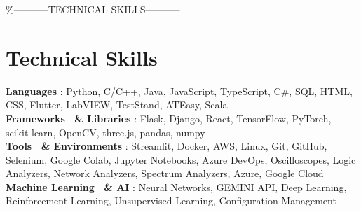 \documentclass[letterpaper,10pt]{article}
\begin{document}
\%-----------TECHNICAL SKILLS-----------
\section{Technical Skills}
 \begin{itemize}[leftmargin=0.15in, label={}]
    \small{\item{
     \textbf{Languages} {: Python, C/C++, Java, JavaScript, TypeScript, C\#, SQL, HTML, CSS, Flutter, LabVIEW, TestStand, ATEasy, Scala} \\
     \textbf{Frameworks \ \& Libraries} {: Flask, Django, React, TensorFlow, PyTorch, scikit-learn, OpenCV, three.js, pandas, numpy} \\
     \textbf{Tools \ \& Environments} {: Streamlit, Docker, AWS, Linux, Git, GitHub, Selenium, Google Colab, Jupyter Notebooks, Azure DevOps, Oscilloscopes, Logic Analyzers, Network Analyzers, Spectrum Analyzers, Azure, Google Cloud} \\
     \textbf{Machine Learning \ \& AI} {: Neural Networks, GEMINI API, Deep Learning, Reinforcement Learning, Unsupervised Learning, Configuration Management} \\
    }}
 \end{itemize}
\end{document}
